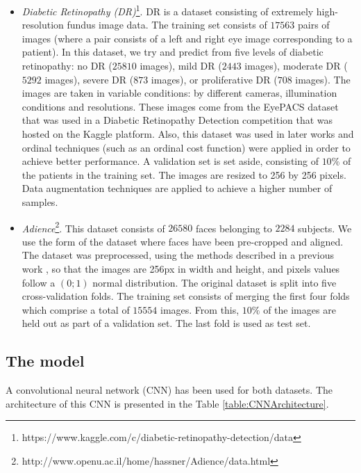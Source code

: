 \documentclass[10pt, a4paper, titlepage, twocolumn]{article}
\begin{document}
	\begin{itemize}
		\item \textit{Diabetic Retinopathy (DR)}\footnote{https://www.kaggle.com/c/diabetic-retinopathy-detection/data}. DR is a dataset consisting of extremely high-resolution fundus image data. The training set consists of $17563$ pairs of images (where a  pair consists of a left and right eye image corresponding to a patient). In this dataset, we try and predict from five levels of diabetic retinopathy: no DR ($25810$ images), mild DR ($2443$ images), moderate DR ($5292$ images), severe DR ($873$ images), or proliferative DR ($708$ images). The images are taken in variable conditions: by different cameras, illumination conditions and resolutions. These images come from the EyePACS dataset that was used in a Diabetic Retinopathy Detection competition that was hosted on the Kaggle platform. Also, this dataset was used in later works \cite{de2018weighted}\cite{nebot2016diabetic} and ordinal techniques (such as an ordinal cost function) were applied in order to achieve better performance. A validation set is set aside, consisting of $10\%$ of the patients in the training set. The images are resized to 256 by 256 pixels. Data augmentation techniques are applied to achieve a higher number of samples.
		
		\item \textit{Adience}\footnote{http://www.openu.ac.il/home/hassner/Adience/data.html}. This dataset consists of $26580$ faces belonging to $2284$ subjects. We use the form of the dataset where faces have been pre-cropped and aligned. The dataset was preprocessed, using the methods described in a previous work \cite{beckham2017unimodal}, so that the images are 256px in width and height, and pixels values follow a $(0;1)$ normal distribution. The original dataset is split into five cross-validation folds. The training set consists of merging the first four folds which comprise a total of $15554$ images. From this, $10\%$ of the images are held out as part of a validation set. The last fold is used as test set.
	\end{itemize}
	
	\subsection{The model}
	A convolutional neural network (CNN) has been used for both datasets. The architecture of this CNN is presented in the Table \ref{table:CNNArchitecture}.
	
\end{document}
